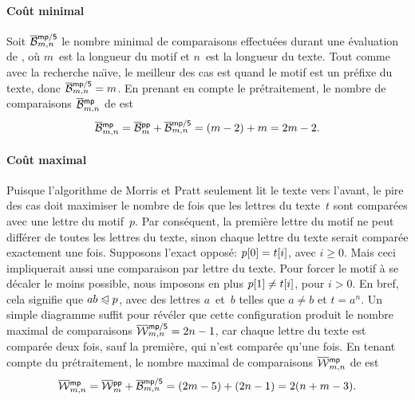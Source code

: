 \paragraph{Coût minimal}

Soit
\(\smash[t]{\OB{\fun{mp/5}}{m,n}}\)
le nombre minimal de comparaisons effectuées durant une évaluation de
, où \(m\)~est la longueur du motif et \(n\)~est la longueur
du texte. Tout comme avec la recherche na\"{\i}ve, le meilleur des cas
est quand le motif est un préfixe du texte, donc
\(\OB{\fun{mp/5}}{m,n} = m\). En prenant en compte le prétraitement,
le nombre de comparaisons
\(\OB{\fun{mp}}{m,n}\) de
 est
\begin{equation*}
\belowdisplayskip=0pt
\OB{\fun{mp}}{m,n} = \OB{\fun{pp}}{m} + \OB{\fun{mp/5}}{m,n} = (m-2)
+ m = 2m - 2.
\end{equation*}

\vspace*{-10pt}

\paragraph{Coût maximal}

Puisque l'algorithme de Morris et Pratt seulement lit le texte vers
l'avant, le pire des cas doit maximiser le nombre de fois que les
lettres du texte~\(t\) sont comparées avec une lettre du
motif~\(p\). Par conséquent, la première lettre du motif ne peut
différer de toutes les lettres du texte, sinon chaque lettre du texte
serait comparée exactement une fois. Supposons l'exact opposé:
\({p}[{0}] = {t}[{i}]\), avec \(i \geqslant 0\). Mais ceci
impliquerait aussi une comparaison par lettre du texte. Pour forcer le
motif à se décaler le moins possible, nous imposons en plus
\({p}[{1}] \neq {t}[{i}]\), pour \(i>0\). En bref, cela signifie
que \(ab \mathrel{\trianglelefteqslant} p\), avec des lettres \(a\)~et~\(b\) telles que \(a
\neq b\) et \(t=a^n\). Un simple diagramme suffit pour révéler que
cette configuration produit le nombre maximal de comparaisons
\(\OW{\fun{mp/5}}{m,n} = 2n - 1\),
car chaque lettre du texte est comparée deux fois, sauf la première,
qui n'est comparée qu'une fois. En tenant compte du prétraitement, le
nombre maximal de comparaisons \(\OW{\fun{mp}}{m,n}\)
 de  est
\begin{equation*}
\belowdisplayskip=0pt
\OW{\fun{mp}}{m,n} = \OW{\fun{pp}}{m} + \OB{\fun{mp/5}}{m,n} = (2m-5)
+ (2n-1) = 2(n + m - 3).
\end{equation*}


